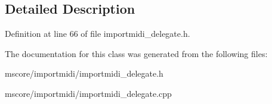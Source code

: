 \subsection{Detailed Description}


Definition at line 66 of file importmidi\+\_\+delegate.\+h.



The documentation for this class was generated from the following files\+:\begin{DoxyCompactItemize}
\item 
mscore/importmidi/importmidi\+\_\+delegate.\+h\item 
mscore/importmidi/importmidi\+\_\+delegate.\+cpp\end{DoxyCompactItemize}
